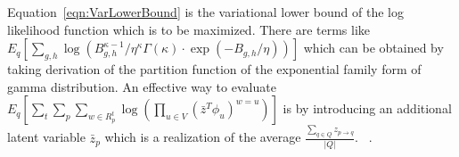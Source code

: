 Equation~\ref{eqn:VarLowerBound} is the variational lower bound of the log
likelihood function which is to be maximized.
There are terms like $ E_q\left[\sum_{g,h} \! \log \! \left( B_{g,h}^{\kappa -
1} / \eta^{\kappa} \Gamma(\kappa) \cdot \exp(-B_{g,h}/\eta) \right) \right]$
which can be obtained by taking derivation of the partition function of the exponential
family form of gamma distribution. An effective way
to evaluate $E_q\left[ \sum_{t} \! \sum_{p} \! \sum_{w\in R_p^t}  \log \! \left(
\prod_{u\in V}(\bar{z}^T\phi_u)^{w = u} \right)\right]$ 
is by introducing an additional latent variable $\bar{z}_p$ which is a
realization of the average $\frac{\sum_{q\in Q} z_{p\rightarrow q}}{|Q|}$. 
~.
